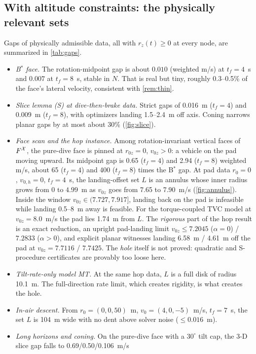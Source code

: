 \subsection{With altitude constraints: the physically relevant sets}
Gaps of physically admissible data, all with $r_z(t)\ge0$ at every node, are summarized in \cref{tab:gaps}.
\begin{itemize}[leftmargin=*,itemsep=2pt]
\item \emph{B$^*$ face.} The rotation-midpoint gap is about $0.010$ (weighted m/s) at $t_f=4$~s and $0.007$ at $t_f=8$~s, stable in
$N$. That is real but tiny, roughly 0.3--0.5\% of the face's lateral velocity, consistent with \cref{rem:thin}.
\item \emph{Slice lemma (S) at dive-then-brake data.} Strict gaps of 0.016~m ($t_f=4$) and 0.009~m ($t_f=8$), with optimizers landing
1.5--2.4~m off axis. Coning narrows planar gaps by at most about 30\% (\cref{fig:slice}).
\item \emph{Face scan and the hop instance.} Among rotation-invariant vertical faces of $F^{\mathcal X}$, the pure-dive face is pinned at
$r_{0z}=0$, $v_{0z}>0$: a vehicle on the pad moving upward. Its midpoint gap is 0.65 ($t_f=4$) and 2.94 ($t_f=8$) weighted m/s,
about 65 ($t_f=4$) and 400 ($t_f=8$) times the B$^*$ gap. At pad data $r_0=0$, $v_{0,h}=0$, $t_f=4$~s, the landing-offset set $L$ is an annulus whose inner
radius grows from 0 to $4.99$~m as $v_{0z}$ goes from 7.65 to 7.90~m/s (\cref{fig:annulus}). Inside the window
$v_{0z}\in(7.727,7.917]$, landing back on the pad is infeasible while landing 0.5--8~m away is feasible. For the torque-coupled TVC
model at $v_{0z}=8.0$~m/s the pad lies 1.74~m from $L$. The \emph{rigorous} part of the hop result is an exact reduction, an
upright pad-landing limit $v_{0z}\le7.2045$ ($\alpha=0$) / $7.2833$ ($\alpha>0$), and explicit planar witnesses landing 6.58~m /
4.61~m off the pad at $v_{0z}=7.7116$ / $7.7425$. The \emph{hole} itself is not proved: quadratic and S-procedure certificates are
provably too loose here.
\item \emph{Tilt-rate-only model MT.} At the same hop data, $L$ is a full disk of radius 10.1~m. The full-direction rate limit, which
creates rigidity, is what creates the hole.
\item \emph{In-air descent.} From $r_0=(0,0,50)$~m, $v_0=(4,0,-5)$~m/s, $t_f=7$~s, the set $L$ is 104~m wide with no dent above
solver noise ($\le0.016$~m).
\item \emph{Long horizons and coning.} On the pure-dive face with a $30^\circ$ tilt cap, the 3-D slice gap falls to 0.69/0.50/0.106~m/s

\end{itemize}

